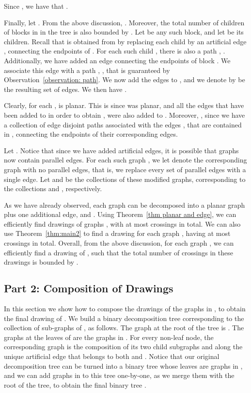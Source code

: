\documentclass[twoside,leqno,twocolumn]{article}
\begin{document}
Since , we have that . 

Finally, let . From the above discussion, . Moreover, the total number of children of blocks in  in the tree  is also bounded by . 
Let  be any such block, and let  be its children. Recall that  is obtained from  by replacing each child  by an artificial edge , connecting the endpoints  of . For each such child , there is also a path , . Additionally, we have added an edge  connecting the endpoints  of block . We associate this edge with a path , , that is guaranteed by Observation~\ref{observation: path}. We now add the edges 
 to , and we denote by  be the resulting set of edges. We then have .

Clearly, for each ,  is planar. This is since  was planar, and all the edges that have been added to  in order to obtain , were also added to . Moreover, , since we have a collection  of edge disjoint paths associated with the edges , that are contained in , connecting the endpoints of their corresponding edges.

Let . Notice that since we have added artificial edges, it is possible that graphs  now contain parallel edges. For each such graph , we let  denote the corresponding graph with no parallel edges, that is, we replace every set of parallel edges with a single edge. Let  and  be the collections of these modified graphs, corresponding to the collections  and , respectively.

As we have already observed, each graph  can be decomposed into a planar graph plus one additional edge, and
 . Using Theorem~\ref{thm planar and edge}, we can efficiently find drawings  of graphs , with at most  crossings in total.
 We can also use Theorem~\ref{thm:main2} to find a drawing  for each graph , having at most  crossings in total. Overall, from the above discussion, for each graph , we can efficiently find a drawing  of , such that the total number of crossings in these drawings is bounded by .

\subsection{Part 2: Composition of Drawings}
In this section we show how to compose the drawings of the graphs in , to obtain the final drawing of .
We build a binary decomposition tree  corresponding to the
collection  of sub-graphs of , as follows.
The graph at the root of the tree is . The graphs at the leaves of 
are the graphs in . For every non-leaf node, the corresponding graph 
is the composition of its two child subgraphs 
and  along the unique artificial edge that belongs to both  and .
Notice that our original decomposition tree  can be turned into a binary tree whose leaves are graphs in , and we can add graphs in  to this tree one-by-one, as we merge them with the root of the tree, to obtain the final binary tree .
\end{document}
